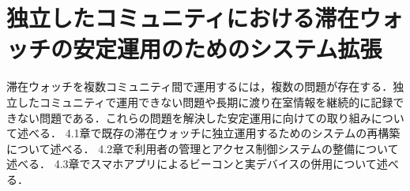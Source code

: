 \chapter{独立したコミュニティにおける滞在ウォッチの安定運用のためのシステム拡張}\label{4}

滞在ウォッチを複数コミュニティ間で運用するには，複数の問題が存在する．独立したコミュニティで運用できない問題や長期に渡り在室情報を継続的に記録できない問題である．これらの問題を解決した安定運用に向けての取り組みについて述べる．
4.1章で既存の滞在ウォッチに独立運用するためのシステムの再構築について述べる．
4.2章で利用者の管理とアクセス制御システムの整備について述べる．
4.3章でスマホアプリによるビーコンと実デバイスの併用について述べる．







